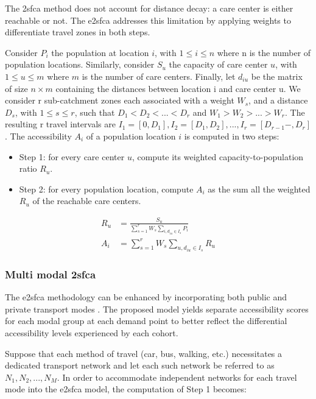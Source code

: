 The \ac{2sfca} method does not account for distance decay: a care center is either reachable or not. The \ac{e2sfca} \cite{luo_enhanced_2009} addresses this limitation by applying weights to differentiate travel zones in both steps.

Consider $P_i$ the population at location $i$, with $1 \leq i \leq n$ where n is the number of population locations. Similarly, consider $S_u$ the capacity of care center $u$, with $1 \leq u \leq m$ where $m$ is the number of care centers. Finally, let $d_{iu}$ be the matrix of size $n \times m$ containing the distances between location i and care center u. We consider r sub-catchment zones each associated with a weight $W_s$, and a distance $D_s$, with $1 \leq s \leq r$, such that $D_1 < D_2 < ... < D_r$ and $W_1 > W_2 > ... > W_r$. The resulting r travel intervals are $I_1=[0, D_1], I_2=[D_1, D_2 ], ... ,I_r=[D_{r-1}-,D_r]$. The accessibility $A_i$ of a population location $i$ is computed in two steps:

\begin{itemize}
    \item Step 1: for every care center $u$, compute its weighted capacity-to-population ratio $R_u$.
    \item Step 2: for every population location, compute $A_i$ as the sum all the weighted $R_u$ of the reachable care centers.
\end{itemize}

\begin{align}
    R_u &=  \frac{S_u}{\sum_{s=1}^{r} W_s \sum_{i, d_{iu} \in I_s} P_i} \\
    A_i &= \sum_{s=1}^{r} W_s \sum_{u, d_{iu} \in I_s} R_u
\end{align}

\subsubsection*{Multi modal \acl{2sfca}}

The \ac{e2sfca} methodology can be enhanced by incorporating both public and private transport modes \cite{langford_multi-modal_2016}. The proposed model yields separate accessibility scores for each modal group at each demand point to better reflect the differential accessibility levels experienced by each cohort.

Suppose that each method of travel (car, bus, walking, etc.) necessitates a dedicated transport network and let each such network be referred to as $N_1, N_2, ..., N_M$. In order to accommodate independent networks for each travel mode into the \ac{e2sfca} model, the computation of Step 1 becomes:

